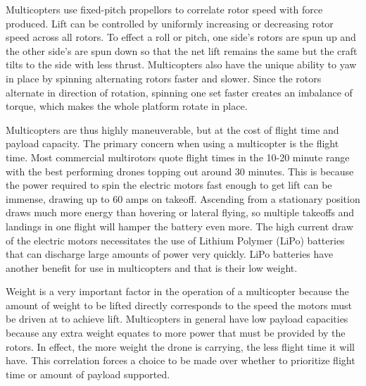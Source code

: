Multicopters use fixed-pitch propellors to correlate rotor speed with force produced. Lift can be controlled by uniformly increasing or decreasing rotor speed across all rotors. To effect a roll or pitch, one side's rotors are spun up and the other side's are spun down so that the net lift remains the same but the craft tilts to the side with less thrust. Multicopters also have the unique ability to yaw in place by spinning alternating rotors faster and slower. Since the rotors alternate in direction of rotation, spinning one set faster creates an imbalance of torque, which makes the whole platform rotate in place\cite{multicopter_dynamics_2}.\par
Multicopters are thus highly maneuverable, but at the cost of flight time and payload capacity. The primary concern when using a multicopter is the flight time. Most commercial multirotors quote flight times in the 10-20 minute range with the best performing drones topping out around 30 minutes\cite{multicopter_comparison}. This is because the power required to spin the electric motors fast enough to get lift can be immense, drawing up to 60 amps on takeoff\cite{multicopter_long_range_mqp}. Ascending from a stationary position draws much more energy than hovering or lateral flying, so multiple takeoffs and landings in one flight will hamper the battery even more. The high current draw of the electric motors necessitates the use of Lithium Polymer (LiPo) batteries that can discharge large amounts of power very quickly. LiPo batteries have another benefit for use in multicopters and that is their low weight.\par
Weight is a very important factor in the operation of a multicopter because the amount of weight to be lifted directly corresponds to the speed the motors must be driven at to achieve lift. Multicopters in general have low payload capacities because any extra weight equates to more power that must be provided by the rotors. In effect, the more weight the drone is carrying, the less flight time it will have. This correlation forces a choice to be made over whether to prioritize flight time or amount of payload supported.\par
